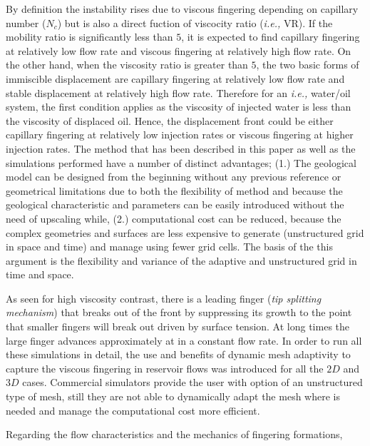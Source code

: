 \documentclass[preprint,authoryear,12pt]{elsarticle}
\newcommand{\ie}{{\it i.e., }}
\begin{document}
  

\medskip
By definition the instability rises due to viscous fingering depending on capillary number ($N_{c}$) but is also a direct fuction of viscocity ratio (\ie VR). If the mobility ratio is significantly less than $5$, it is expected to find capillary fingering at relatively low flow rate and viscous fingering at relatively high flow rate. On the other hand, when the viscosity ratio is greater than $5$, the two basic forms of immiscible displacement are capillary fingering at relatively low flow rate and stable displacement at relatively high flow rate. Therefore for an \ie water/oil system, the first condition applies as the viscosity of injected water is less than the viscosity of displaced oil. Hence, the displacement front could be either capillary fingering at relatively low injection rates or viscous fingering at higher injection rates. The method that has been described in this paper as well as the simulations performed have a number of distinct advantages; (1.) The geological model can be designed from the beginning without any previous reference or geometrical limitations due to both the flexibility of method and because the geological characteristic and parameters can be easily introduced without the need of upscaling while, (2.) computational cost can be reduced, because the complex geometries and surfaces are less expensive to generate (unstructured grid in space and time) and manage using fewer grid cells. The basis of the this argument is the flexibility and variance of the adaptive and unstructured grid in time and space.

\medskip
As seen for high viscosity contrast, there is a leading finger (\textit{tip splitting mechanism}) that breaks out of the front by suppressing its growth to the point that smaller fingers will break out driven by surface tension. At long times the large finger advances approximately at in a constant flow rate. In order to run all these simulations in detail, the use and benefits of dynamic mesh adaptivity to capture the viscous fingering in reservoir flows was introduced for all the $2D$ and $3D$ cases. Commercial simulators provide the user with option of an unstructured type of mesh, still they are not able to dynamically adapt the mesh where is needed and manage the computational cost more efficient.

\medskip
Regarding the flow characteristics and the mechanics of fingering formations,
\end{document}
